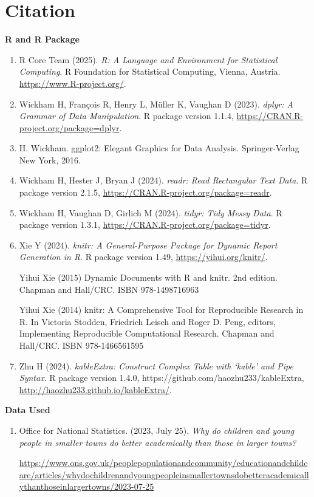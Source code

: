 \documentclass[11pt,en]{../tex/elegantpaper}
\begin{document}
\section{Citation}\label{citation}

\textbf{R and R Package}

\begin{enumerate}
\def\labelenumi{\arabic{enumi}.}
\item
  R Core Team (2025). \emph{R: A Language and Environment for
  Statistical Computing}. R Foundation for Statistical Computing,
  Vienna, Austria. \url{https://www.R-project.org/}.
\item
  Wickham H, François R, Henry L, Müller K, Vaughan D (2023).
  \emph{dplyr: A Grammar of Data Manipulation}. R package version 1.1.4,
  \url{https://CRAN.R-project.org/package=dplyr}.
\item
  H. Wickham. ggplot2: Elegant Graphics for Data Analysis.
  Springer-Verlag New York, 2016.
\item
  Wickham H, Hester J, Bryan J (2024). \emph{readr: Read Rectangular
  Text Data}. R package version 2.1.5,
  \url{https://CRAN.R-project.org/package=readr}.
\item
  Wickham H, Vaughan D, Girlich M (2024). \emph{tidyr: Tidy Messy Data}.
  R package version 1.3.1,
  \url{https://CRAN.R-project.org/package=tidyr}.
\item
  Xie Y (2024). \emph{knitr: A General-Purpose Package for Dynamic
  Report Generation in R}. R package version 1.49,
  \url{https://yihui.org/knitr/}.

  Yihui Xie (2015) Dynamic Documents with R and knitr. 2nd edition.
  Chapman and Hall/CRC. ISBN 978-1498716963

  Yihui Xie (2014) knitr: A Comprehensive Tool for Reproducible Research
  in R. In Victoria Stodden, Friedrich Leisch and Roger D. Peng,
  editors, Implementing Reproducible Computational Research. Chapman and
  Hall/CRC. ISBN 978-1466561595
\item
  Zhu H (2024). \emph{kableExtra: Construct Complex Table with `kable'
  and Pipe Syntax}. R package version 1.4.0,
  https://github.com/haozhu233/kableExtra,
  \url{http://haozhu233.github.io/kableExtra/}.
\end{enumerate}

\textbf{Data Used}

\begin{enumerate}
\def\labelenumi{\arabic{enumi}.}
\item
  Office for National Statistics. (2023, July 25). \emph{Why do children
  and young people in smaller towns do better academically than those in
  larger towns?}

  \url{https://www.ons.gov.uk/peoplepopulationandcommunity/educationandchildcare/articles/whydochildrenandyoungpeopleinsmallertownsdobetteracademicallythanthoseinlargertowns/2023-07-25}
\end{enumerate}
\end{document}
